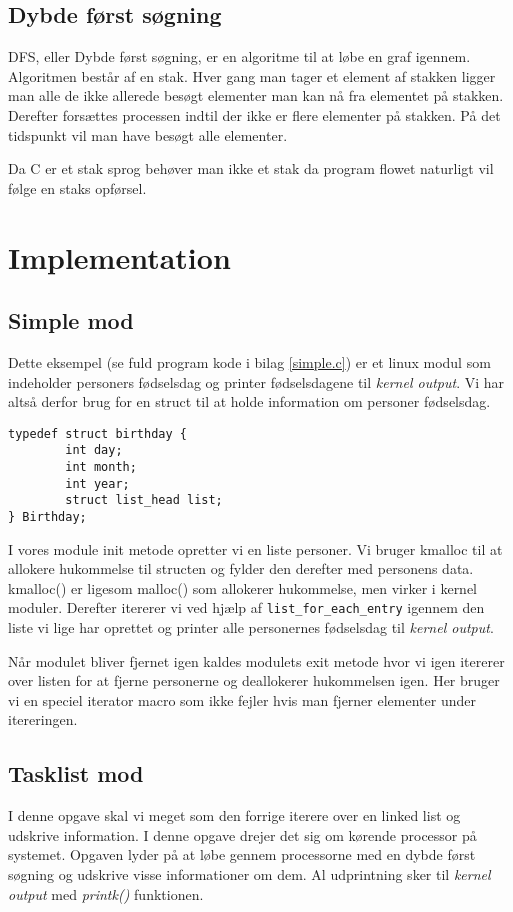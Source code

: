 \documentclass[danish]{report}
\begin{document}
\section{Dybde først søgning}
DFS, eller Dybde først søgning, er en algoritme til at løbe en graf igennem. Algoritmen består af en stak. Hver gang man tager et element af stakken ligger man alle de ikke allerede besøgt elementer man kan nå fra elementet på stakken. Derefter forsættes processen indtil der ikke er flere elementer på stakken. På det tidspunkt vil man have besøgt alle elementer.

Da C er et stak sprog behøver man ikke et stak da program flowet naturligt vil følge en staks opførsel.

\chapter{Implementation}
\section{Simple mod}

Dette eksempel (se fuld program kode i bilag \ref{simple.c}) er et linux modul som indeholder personers fødselsdag og printer fødselsdagene til \textit{kernel output}. Vi har altså derfor brug for en struct til at holde information om personer fødselsdag.

\begin{lstlisting}
typedef struct birthday {
        int day;
        int month;
        int year;
        struct list_head list;
} Birthday;
\end{lstlisting}

I vores module init metode opretter vi en liste personer. Vi bruger kmalloc til at allokere hukommelse til structen og fylder den derefter med personens data. kmalloc() er ligesom malloc() som allokerer hukommelse, men virker i kernel moduler. Derefter itererer vi ved hjælp af \texttt{list\_for\_each\_entry} igennem den liste vi lige har oprettet og printer alle personernes fødselsdag til \textit{kernel output}.

Når modulet bliver fjernet igen kaldes modulets exit metode hvor vi igen itererer over listen for at fjerne personerne og deallokerer hukommelsen igen. Her bruger vi en speciel iterator macro som ikke fejler hvis man fjerner elementer under itereringen.

\section{Tasklist mod}
I denne opgave skal vi meget som den forrige iterere over en linked list og udskrive information. I denne opgave drejer det sig om kørende processor på systemet. Opgaven lyder på at løbe gennem processorne med en dybde først søgning og udskrive visse informationer om dem. Al udprintning sker til \textit{kernel output} med \textit{printk()} funktionen.
\end{document}
